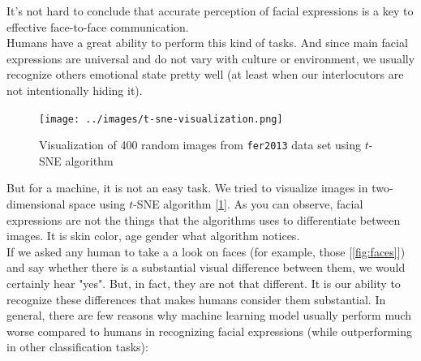It's not hard to conclude that accurate perception of facial expressions is a key to effective face-to-face communication.\\

Humans have a great ability to perform this kind of tasks. And since main facial expressions are universal and do not vary with culture or environment, we usually recognize others emotional state pretty well (at least when our interlocutors are not intentionally hiding it).\\

\begin{figure}
	\centering
	\texttt{[image: ../images/t-sne-visualization.png]}
	\caption{Visualization of 400 random images from \texttt{fer2013} data set using $t$-SNE algorithm}
	\label{fig:tsne}
\end{figure}

But for a machine, it is not an easy task. We tried to visualize images in two-dimensional space using $t$-SNE algorithm [\ref{fig:tsne}]. As you can observe, facial expressions are not the things that the algorithms uses to differentiate between images. It is skin color, age gender what algorithm notices.\\

If we asked any human to take a a look on faces (for example, those [\ref{fig:faces}]) and say whether there is a substantial visual difference between them, we would certainly hear "yes". But, in fact, they are not that different. It is our ability to recognize these differences that makes humans consider them substantial. In general, there are few reasons why machine learning model usually perform much worse compared to humans in recognizing facial expressions (while outperforming in other classification tasks):

